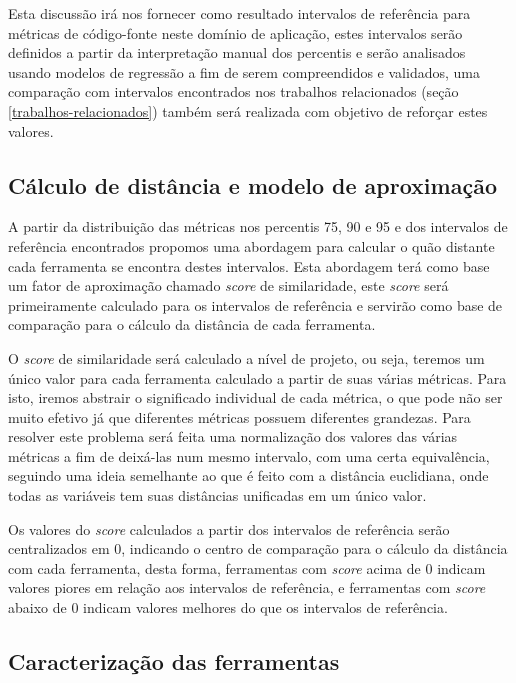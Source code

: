 Esta discussão irá nos fornecer como resultado intervalos de referência para
métricas de código-fonte neste domínio de aplicação, estes intervalos serão
definidos a partir da interpretação manual dos percentis e serão analisados
usando modelos de regressão a fim de serem compreendidos e validados, uma
comparação com intervalos encontrados nos trabalhos relacionados (seção
\ref{trabalhos-relacionados}) também será realizada com objetivo de reforçar
estes valores.

\subsection{Cálculo de distância e modelo de aproximação} \label{distancia}

A partir da distribuição das métricas nos percentis 75, 90 e 95 e dos
intervalos de referência encontrados propomos uma abordagem para calcular o
quão distante cada ferramenta se encontra destes intervalos.  Esta abordagem
terá como base um fator de aproximação chamado {\it score} de similaridade,
este {\it score} será primeiramente calculado para os intervalos de referência
e servirão como base de comparação para o cálculo da distância de cada
ferramenta.

O {\it score} de similaridade será calculado a nível de projeto, ou seja,
teremos um único valor para cada ferramenta calculado a partir de suas várias
métricas. Para isto, iremos abstrair o significado individual de cada métrica,
o que pode não ser muito efetivo já que diferentes métricas possuem diferentes
grandezas. Para resolver este problema será feita uma normalização dos valores
das várias métricas a fim de deixá-las num mesmo intervalo, com uma certa
equivalência, seguindo uma ideia semelhante ao que é feito com a distância
euclidiana, onde todas as variáveis tem suas distâncias unificadas em um único
valor.

Os valores do {\it score} calculados a partir dos intervalos de referência
serão centralizados em 0, indicando o centro de comparação para o cálculo da
distância com cada ferramenta, desta forma, ferramentas com {\it score} acima
de 0 indicam valores piores em relação aos intervalos de referência, e
ferramentas com {\it score} abaixo de 0 indicam valores melhores do que os
intervalos de referência.

\subsection{Caracterização das ferramentas} \label{caracterizacao-das-ferramentas}

